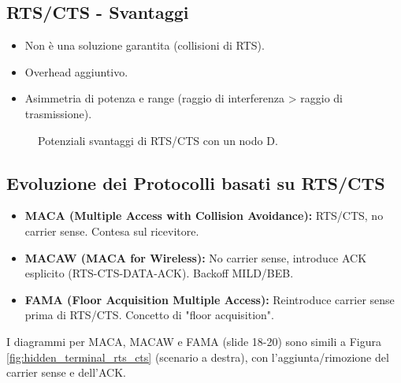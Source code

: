\subsection{RTS/CTS - Svantaggi}
\begin{itemize}
    \item Non è una soluzione garantita (collisioni di RTS).
    \item Overhead aggiuntivo.
    \item Asimmetria di potenza e range (raggio di interferenza > raggio di trasmissione).
\end{itemize}
\begin{figure}[H]
\centering
{}
\caption{Potenziali svantaggi di RTS/CTS con un nodo D.}
\label{fig:rts_cts_drawbacks}
\end{figure}

\subsection{Evoluzione dei Protocolli basati su RTS/CTS}
\begin{itemize}
    \item \textbf{MACA (Multiple Access with Collision Avoidance):} RTS/CTS, no carrier sense. Contesa sul ricevitore.
    \item \textbf{MACAW (MACA for Wireless):} No carrier sense, introduce ACK esplicito (RTS-CTS-DATA-ACK). Backoff MILD/BEB.
    \item \textbf{FAMA (Floor Acquisition Multiple Access):} Reintroduce carrier sense prima di RTS/CTS. Concetto di "floor acquisition".
\end{itemize}
I diagrammi per MACA, MACAW e FAMA (slide 18-20) sono simili a Figura \ref{fig:hidden_terminal_rts_cts} (scenario a destra), con l'aggiunta/rimozione del carrier sense e dell'ACK.

